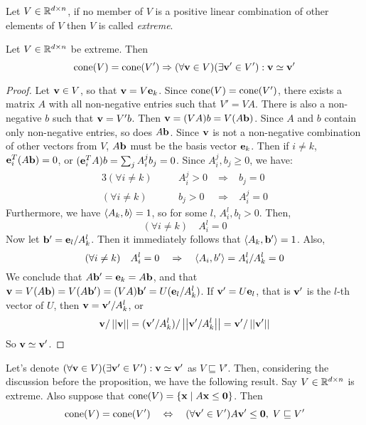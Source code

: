\begin{Def}[Extreme]
  Let $V \in \mathbb{R}^{d\times n}$, if no member of $V$ is a positive linear combination of other elements of $V$ then $V$ is called \textit{extreme}.
\end{Def}


\begin{Prop}{\label{prop:minrays}
  Let $V \in \mathbb{R}^{d\times n}$ be extreme.  Then
  \[ \operatorname{cone}(V) = \operatorname{cone}(V') \Rightarrow (\forall \mathbf{v} \in V)(\exists \mathbf{v}'\in V') 
                            : \mathbf{v} \simeq \mathbf{v}' \]
} \end{Prop}

\begin{proof}
Let $\mathbf{v} \in V$, so that $\mathbf{v} = V\mathbf{e}_k$.  Since $\operatorname{cone}(V) = \operatorname{cone}(V')$, there exists a matrix $A$ with all non-negative entries such that $V' = VA$.  There is also a non-negative $b$ such that $\mathbf{v} = V'b$.  Then $\mathbf{v} = (VA)b = V(A\mathbf{b})$.  Since $A$ and $b$ contain only non-negative entries, so does $A\mathbf{b}$.  Since $\mathbf{v}$ is not a non-negative combination of other vectors from $V$, $A\mathbf{b}$ must be the basis vector $\mathbf{e}_k$.  Then if $i \neq k$, $\mathbf{e}_i^T(A\mathbf{b}) = 0$, or $(\mathbf{e}_i^TA)b = \sum_j A_i^j b_j = 0$.  Since $A_i^j, b_j \geq 0$, we have:
\begin{alignat*}{3}
  (\forall i \neq k)&\quad&A_i^j > 0 \;&\Rightarrow&\; b_j = 0 \\
  (\forall i \neq k)&\quad&b_j > 0   \;&\Rightarrow&\; A_i^j = 0
\end{alignat*}
Furthermore, we have $\left\langle A_k, b \right\rangle = 1$, so for some $l$, $A_i^l,b_l > 0$.  Then, 
\[ (\forall i \neq k)\quad A_i^l = 0 \]
Now let $\mathbf{b}'=\mathbf{e}_l/A_k^l$.  Then it immediately follows that $\left\langle A_k, \mathbf{b}' \right\rangle = 1$.  Also,
\[ (\forall i \neq k)\quad A_i^l = 0 \quad \Rightarrow\quad \left\langle A_i, b' \right\rangle = A_i^l/A_k^l = 0\]
We conclude that $A\mathbf{b}' = \mathbf{e}_k = A\mathbf{b}$, and that $\mathbf{v} = V(A\mathbf{b}) = V(A\mathbf{b}') = (VA)\mathbf{b}' = U(\mathbf{e}_l/A_k^l)$.  If $\mathbf{v}' = U\mathbf{e}_l$, that is $\mathbf{v}'$ is the $l$-th vector of $U$, then $\mathbf{v} = \mathbf{v}'/A_k^l$, or 
\[ \mathbf{v}/\left|\left|\mathbf{v}\right|\right| = (\mathbf{v}'/A_k^l)/\left|\left|\mathbf{v}'/A_k^l\right|\right| = \mathbf{v}'/\left|\left|\mathbf{v}'\right|\right| \]
So $\mathbf{v} \simeq \mathbf{v}'$.
\end{proof}

Let's denote $(\forall \mathbf{v} \in V)(\exists \mathbf{v}'\in V') : \mathbf{v} \simeq \mathbf{v}'$ as $V \sqsubseteq V'$.  Then, considering the discussion before the proposition, we have the following result.  Say $V \in \mathbb{R}^{d\times n}$ is extreme.  Also suppose that $\operatorname{cone}(V) = \left\{\mathbf{x}\;|\; A\mathbf{x}\leq\mathbf{0}\right\}$.  Then
\[ \operatorname{cone}(V) = \operatorname{cone}(V') \quad\Leftrightarrow\quad 
   (\forall \mathbf{v}'\in V')A\mathbf{v}'\leq\mathbf{0},\; V \sqsubseteq V' \]

